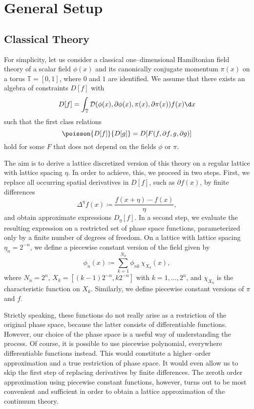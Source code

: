 \section{General Setup}
\label{sec:General Setup}

\subsection{Classical Theory}
For simplicity, let us consider a classical one--dimensional Hamiltonian field theory of a scalar field $\phi(x)$ and its canonically conjugate momentum $\pi(x)$ on a torus $\mathbb T = [0,1]$, where $0$ and $1$ are identified.
We assume that there exists an algebra of constraints $D[f]$ with
\begin{equation}
    D[f] = \int_{\mathbb T} \mathcal D(\phi(x), \partial \phi(x), \pi(x), \partial \pi(x)) f(x) \d x 
\end{equation}
such that the first class relations
\begin{equation}
    \poisson{D[f]}{D[g]} = D[F(f,\partial f,g,\partial g)] \label{eq:classical-continuum-algebra}
\end{equation}
hold for some $F$ that does not depend on the fields $\phi$ or $\pi$.

The aim is to derive a lattice discretized version of this theory on a regular lattice with lattice spacing $\eta$.
In order to achieve, this, we proceed in two steps.
First, we replace all occurring spatial derivatives in $D[f]$, such as $\partial f(x)$, by finite differences
\begin{equation}
    \Delta^\eta f(x) \coloneq \frac{f(x+\eta)-f(x)}\eta,
\end{equation}
and obtain approximate expressions $D_\eta[f]$.
In a second step, we evaluate the resulting expression on a restricted set of phase space functions, parameterized only by a finite number of degrees of freedom.
On a lattice with lattice spacing $\eta_n = 2^{-n}$, we define a piecewise constant version of the field given by
\begin{equation}
    \phi_n(x) \coloneq \sum_{k=1}^{N_n} \phi_{nk} \, \chi_{X_k}(x),
\end{equation}
where $N_n = 2^n$, $X_k = [(k-1) 2^{-n}, k 2^{-n}]$ with $k = 1, \dots, 2^n$, and $\chi_{X_k}$ is the characteristic function on $X_k$.
Similarly, we define piecewise constant versions of $\pi$ and $f$.

Strictly speaking, these functions do not really arise as a restriction of the original phase space, because the latter consists of differentiable functions.
However, our choice of the phase space is a useful way of understanding the process.
Of course, it is possible to use piecewise polynomial, everywhere differentiable functions instead.
This would constitute a higher--order approximation and a true restriction of phase space.
It would even allow us to skip the first step of replacing derivatives by finite differences.
The zeroth order approximation using piecewise constant functions, however, turns out to be most convenient and sufficient in order to obtain a lattice approximation of the continuum theory.

